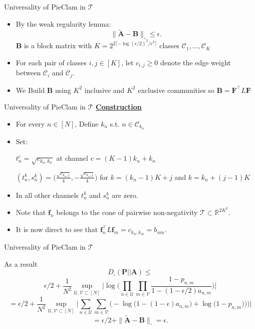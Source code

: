 \documentclass{beamer}
\begin{document}
\begin{frame}{Universality of PieClam in $\mathcal{T}$}
\begin{itemize}[itemsep=20pt, label=\textbullet]
\item By the weak regularity lemma:
\[\|\tilde{\mathbf{A}}-\mathbf{B}\|_{\square} \leq \epsilon.\]
$\mathbf{B}$ is a block matrix with $K=2^{2\lceil -\log(\epsilon/2)^2/\epsilon^2\rceil}$ classes $\mathcal{C}_1,\ldots,\mathcal{C}_K$
\item For each pair of classes $i,j\in[K]$, let $c_{i,j}\geq 0$ denote the edge weight between $\mathcal{C}_i$ and $\mathcal{C}_j$.

\item We Build $\mathbf{B}$ using $K^2$ inclusive and $K^2$ exclusive communities so $\mathbf{B}=\mathbf{F}^\top L \mathbf{F}$

\end{itemize}    


\end{frame}


\begin{frame}{Universality of PieClam in $\mathcal{T}$}
\textbf{\underline{Construction}}
\begin{itemize}[label=\textbullet, itemsep=10pt]
\item For every $n\in[N]$, Define $k_n$ s.t. $n\in\mathcal{C}_{k_n}$

\item Set: 

$t_n^c=\sqrt{c_{k_n,k_n}}$ at channel $c=(K-1)k_n+k_n$

$(t_n^k, s_n^k)=\Big(\frac{\sqrt{c_{k_n,j}}}{4},-\frac{\sqrt{c_{k_n,j}}}{4}\Big) $ for $k=(k_n-1)K+j$ and $k=k_n+(j-1)K$

 \item In all other channels $t^k_n$ and $s^k_n$ are zero. 
 
 \item Note that $\mathbf{f}_n$ belongs to the cone of pairwise non-negativity $\mathcal{T}\subset \mathbb{R}^{2K^2}$.

 \item It is now direct to see that  $\mathbf{f}_n^\top L \mathbf{f}_m=c_{k_n,k_m} = b_{nm}$.
\end{itemize}
    
\end{frame}

\begin{frame}{Universality of PieClam in $\mathcal{T}$}
    

  As a result
\[D_{\square}(\mathbf{P}||\mathbf{A}) \leq \]
\[\epsilon/2+\frac{1}{N^2}\sup_{\mathcal{U},\mathcal{V}\subset[N]}\Big|\log\Big(\prod_{n\in \mathcal{U}}\prod_{m\in \mathcal{V}}
\frac{1-p_{n,m}}{1-(1-\epsilon/2)a_{n,m}}\Big)\Big|\]
\[ =
\epsilon/2+\frac{1}{N^2}\sup_{\mathcal{U},\mathcal{V}\subset[N]}\Big|\sum_{n\in \mathcal{U}}\sum_{m\in \mathcal{V}}\Big(-\log\big(1-(1-\epsilon)a_{n,m}\big) + \log\big(1-p_{n,m})\big)\Big)\Big|\]
\[=\epsilon/2 + \| \tilde{\mathbf{A}}-\mathbf{B} \|_{\square} = \epsilon. \]

  
\end{frame}
\end{document}

